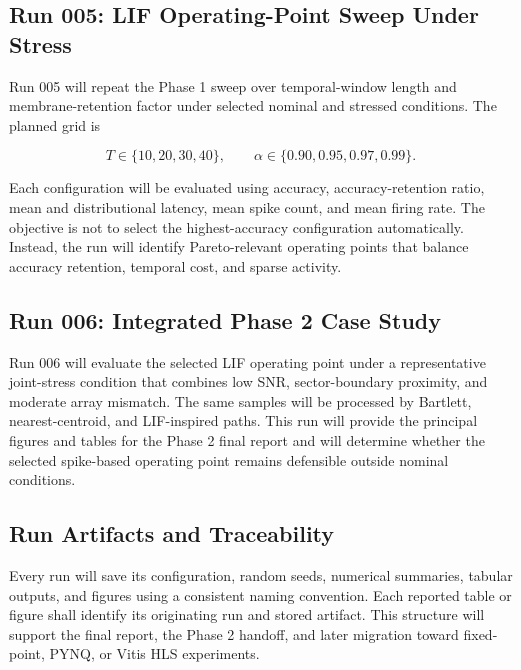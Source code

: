\subsection{Run 005: LIF Operating-Point Sweep Under Stress}

Run 005 will repeat the Phase 1 sweep over temporal-window length and membrane-retention factor under selected nominal and stressed conditions. The planned grid is

\[
T \in \{10,20,30,40\},
\qquad
\alpha \in \{0.90,0.95,0.97,0.99\}.
\]

Each configuration will be evaluated using accuracy, accuracy-retention ratio, mean and distributional latency, mean spike count, and mean firing rate. The objective is not to select the highest-accuracy configuration automatically. Instead, the run will identify Pareto-relevant operating points that balance accuracy retention, temporal cost, and sparse activity.

\subsection{Run 006: Integrated Phase 2 Case Study}

Run 006 will evaluate the selected LIF operating point under a representative joint-stress condition that combines low SNR, sector-boundary proximity, and moderate array mismatch. The same samples will be processed by Bartlett, nearest-centroid, and LIF-inspired paths. This run will provide the principal figures and tables for the Phase 2 final report and will determine whether the selected spike-based operating point remains defensible outside nominal conditions.

\subsection{Run Artifacts and Traceability}

Every run will save its configuration, random seeds, numerical summaries, tabular outputs, and figures using a consistent naming convention. Each reported table or figure shall identify its originating run and stored artifact. This structure will support the final report, the Phase 2 handoff, and later migration toward fixed-point, PYNQ, or Vitis HLS experiments.
